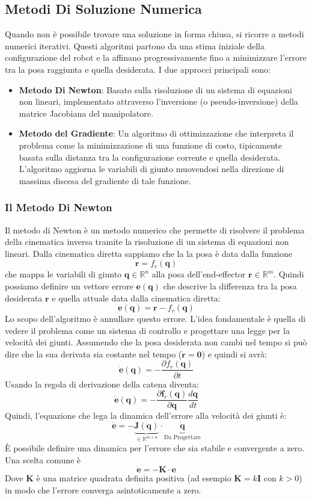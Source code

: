 ﻿\documentclass[11pt, a4paper]{article}
\begin{document}
\subsection{Metodi Di Soluzione Numerica}
Quando non è possibile trovare una soluzione in forma chiusa, si ricorre a metodi numerici iterativi. Questi algoritmi partono da una stima iniziale della configurazione del robot e la affinano progressivamente fino a minimizzare l'errore tra la posa raggiunta e quella desiderata. I due approcci principali sono:
\begin{itemize}
    \item \textbf{Metodo Di Newton}: Basato sulla risoluzione di un sistema di equazioni non lineari, implementato attraverso l'inversione (o pseudo-inversione) della matrice Jacobiana del manipolatore.
    \item \textbf{Metodo del Gradiente}: Un algoritmo di ottimizzazione che interpreta il problema come la minimizzazione di una funzione di costo, tipicamente basata sulla distanza tra la configurazione corrente e quella desiderata. L'algoritmo aggiorna le variabili di giunto muovendosi nella direzione di massima discesa del gradiente di tale funzione.
\end{itemize}

\newpage
\subsubsection{Il Metodo Di Newton}
Il metodo di Newton è un metodo numerico che permette di risolvere il problema della cinematica inversa tramite la risoluzione di un sistema di equazioni non lineari. Dalla cinematica diretta sappiamo che la la posa è data dalla funzione
\[
    \bm{r} = f_{r}(\bm{q})
\]
che mappa le variabili di giunto \(\bm{q} \in \mathbb{R}^n\) alla posa dell'end-effector \(\bm{r} \in \mathbb{R}^m\). Quindi possiamo definire un vettore errore \(\bm{e}(\bm{q})\) che descrive la differenza tra la posa desiderata \(\bm{r}\) e quella attuale data dalla cinematica diretta:
\[
    \bm{e}(\bm{q}) = \bm{r} - f_{r}(\bm{q})
\]
Lo scopo dell'algoritmo è annullare questo errore. L'idea fondamentale è quella di vedere il problema come un sistema di controllo e progettare una legge per la velocità dei giunti. Assumendo che la posa desiderata non cambi nel tempo si può dire che la sua derivata sia costante nel tempo (\(\dot{\bm{r}} = \bm{0}\)) e quindi si avrà:
\[
    \dot{\bm{e}}(\bm{q}) = - \frac{\partial f_{r}(\bm{q})}{\partial t}
\]
Usando la regola di derivazione della catena diventa:
\[
    \dot{\bm{e}}(\bm{q}) = -\frac{\partial \bm{f}_r(\bm{q})}{\partial \bm{q}} \frac{d\bm{q}}{dt}
\]
Quindi, l'equazione che lega la dinamica dell'errore alla velocità dei giunti è:
\[
    \boxed{\dot{\bm{e}} = - \underbrace{\bm{J}(\bm{q})}_{\in \mathbb{R}^{m \times n}} \cdot \underbrace{\dot{\bm{q}}}_{\text{Da Progettare}}}
\]
È possibile definire una dinamica per l'errore che sia stabile e convergente a zero.\\
Una scelta comune è
\[
    \dot{\bm{e}} = -\bm{K} \cdot \bm{e}
\]
Dove \(\bm{K}\) è una matrice quadrata definita positiva (ad esempio \(\bm{K} = k\bm{I}\) con \(k>0\)) in modo che l'errore converga asintoticamente a zero.
\end{document}
